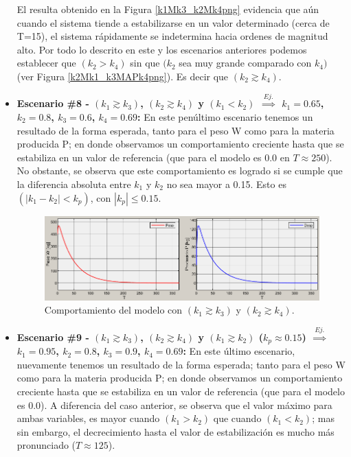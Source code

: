 \begin{itemize}
    El resulta obtenido en la Figura \ref{k1Mk3_k2Mk4png} evidencia que aún cuando el sistema tiende a estabilizarse en un valor determinado (cerca de T=15), el sistema rápidamente se indetermina hacia ordenes de magnitud alto. Por todo lo descrito en este y los escenarios anteriores podemos establecer que $(k_{2} > k_{4})$ sin que $(k_{2}$ sea muy grande comparado con $k_{4})$ (ver Figura \ref{k2Mk1_k3MAPk4png}). Es decir que $(k_{2} \gtrsim k_{4})$.
    
    \item \textbf{Escenario \#8 - $(k_{1}\gtrsim k_{3})$, $(k_{2}\gtrsim k_{4})$ y $(k_{1}<k_{2})$ $\overset{Ej.}{\implies}$ $k_{1}=0.65$, $k_{2}=0.8$, $k_{3}=0.6$, $k_{4}=0.69$:} En este penúltimo escenario tenemos un resultado de la forma esperada, tanto para el peso W como para la materia producida P; en donde observamos un comportamiento creciente hasta que se estabiliza en un valor de referencia (que para el modelo es 0.0 en $T\approx 250$). No obstante, se observa que este comportamiento es logrado si se cumple que la diferencia absoluta entre $k_{1}$ y $k_{2}$ no sea mayor a 0.15. Esto es $(|k_{1} - k_{2}| < k_{p})$, con $|k_{p}| \leq 0.15$.
    
            \begin{figure}[H]
        	   \centering
        	   \includegraphics[scale=0.75]{img/k1MAPk3_k2MAPk4.png}
        	   \caption{Comportamiento del modelo con $(k_{1}\gtrsim k_{3})$ y $(k_{2}\gtrsim k_{4})$. \label{kiMAPpng}}
            \end{figure}

    \item \textbf{Escenario \#9 - $(k_{1}\gtrsim k_{3})$, $(k_{2}\gtrsim k_{4})$ y $(k_{1}\gtrsim k_{2})$ ($k_{p}\approx0.15$) $\overset{Ej.}{\implies}$ $k_{1}=0.95$, $k_{2}=0.8$, $k_{3}=0.9$, $k_{4}=0.69$:}  En este último escenario, nuevamente tenemos un resultado de la forma esperada; tanto para el peso W como para la materia producida P; en donde observamos un comportamiento creciente hasta que se estabiliza en un valor de referencia (que para el modelo es 0.0). A diferencia del caso anterior, se observa que el valor máximo para ambas variables, es mayor cuando $(k_{1}>k_{2})$ que cuando $(k_{1}<k_{2})$; mas sin embargo, el decrecimiento hasta el valor de estabilización es mucho más pronunciado ($T\approx 125$).
    

\end{itemize}
